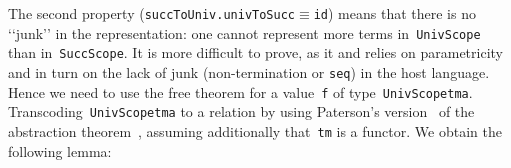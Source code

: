 \documentclass[9pt,preprint,authoryear]{sigplanconf}
\begin{document}
%
The second property (\textcolor[rgb]{0,0,0.80}{\texttt{succToUniv}}\textcolor[rgb]{0,0,0.80}{\texttt{\mbox{\hspace{0.50em}}}}\textcolor[cmyk]{0,0.65,0.99,0}{\texttt{.}}\textcolor[rgb]{0,0,0.80}{\texttt{\mbox{\hspace{0.50em}}}}\textcolor[rgb]{0,0,0.80}{\texttt{univToSucc}}\textcolor[rgb]{0,0,0.80}{\texttt{\mbox{\hspace{0.50em}}}}\textcolor[cmyk]{0,0.65,0.99,0}{\texttt{$ \equiv $}}\textcolor[rgb]{0,0,0.80}{\texttt{\mbox{\hspace{0.50em}}}}\textcolor[rgb]{0,0,0.80}{\texttt{id}}) means that
    there is no {`}{`}junk{'}{'} in the representation{:}  one cannot
    represent more terms in{~}\textcolor[rgb]{0,0,0.80}{\texttt{UnivScope}} than in{~}\textcolor[rgb]{0,0,0.80}{\texttt{SuccScope}}.
    It is more
    difficult to prove, as it 
    and relies on parametricity and in turn on the lack of junk (non-termination or \textcolor[rgb]{0,0,0.80}{\texttt{seq}}) 
    in the host language. 
    Hence we need to use the free
    theorem for a value{~}\textcolor[rgb]{0,0,0.80}{\texttt{f}} of type{~}\textcolor[rgb]{0,0,0.80}{\texttt{UnivScope}}\textcolor[rgb]{0,0,0.80}{\texttt{\mbox{\hspace{0.50em}}}}\textcolor[rgb]{0,0,0.80}{\texttt{tm}}\textcolor[rgb]{0,0,0.80}{\texttt{\mbox{\hspace{0.50em}}}}\textcolor[rgb]{0,0,0.80}{\texttt{a}}.
    Transcoding{~}\textcolor[rgb]{0,0,0.80}{\texttt{UnivScope}}\textcolor[rgb]{0,0,0.80}{\texttt{\mbox{\hspace{0.50em}}}}\textcolor[rgb]{0,0,0.80}{\texttt{tm}}\textcolor[rgb]{0,0,0.80}{\texttt{\mbox{\hspace{0.50em}}}}\textcolor[rgb]{0,0,0.80}{\texttt{a}} to a relation by using Paterson{'}s
    version{~}\cite{fegaras_revisiting_1996} of the abstraction
    theorem{~}\cite{reynolds-83,bernardy_proofs_2012}, assuming additionally
    that{~}\textcolor[rgb]{0,0,0.80}{\texttt{tm}} is a functor. We obtain the following lemma{:}%


%
%


{\nopagebreak }
\end{document}
